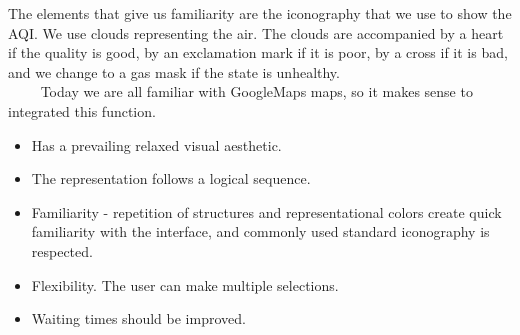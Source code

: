 The elements that give us familiarity are the iconography that we use to show the AQI. We use clouds representing
the air. The clouds are accompanied by a heart if the quality is good, by an exclamation mark if it is poor, by a cross if it is
bad, and we change to a gas mask if the state is unhealthy.\\
    
Today we are all familiar with GoogleMaps maps, so it makes sense to integrated this function.      

\begin{itemize}
    \item Has a prevailing relaxed visual aesthetic.
    \item The representation follows a logical sequence.
    \item Familiarity - repetition of structures and representational colors create quick familiarity with the interface, and commonly used standard iconography is respected.
    \item Flexibility. The user can make multiple selections.
    \item Waiting times should be improved.
\end{itemize}